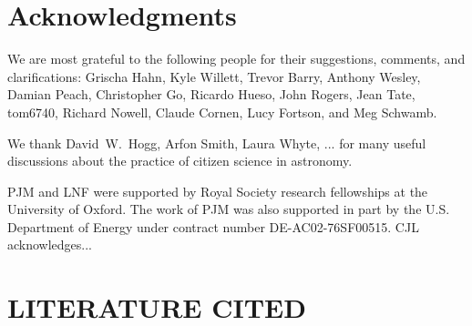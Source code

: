 \documentclass{ar2e}
\begin{document}

\section*{Acknowledgments}

We are most grateful to the following people for their suggestions,  comments,
and clarifications: Grischa Hahn, Kyle Willett, 
Trevor Barry, Anthony Wesley, Damian Peach, 
Christopher Go, Ricardo Hueso, John Rogers, Jean Tate, tom6740, Richard Nowell,
Claude Cornen, Lucy Fortson, and Meg Schwamb.

We thank David~W.~Hogg, Arfon Smith, Laura Whyte, ... for many useful
discussions about the practice of citizen science in astronomy.

PJM and LNF were supported by Royal Society research fellowships at the
University of Oxford. The work of PJM was also supported in part  by the U.S.
Department of Energy under contract number DE-AC02-76SF00515.
%
CJL acknowledges...



\section{LITERATURE CITED}




\end{document}
